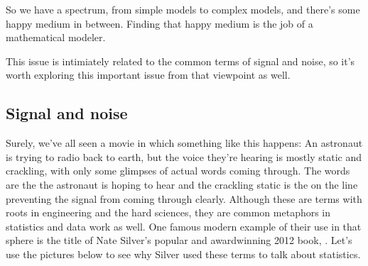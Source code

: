 \documentclass[letterpaper,10pt,english]{sphinxmanual}
\begin{document}
So we have a spectrum, from simple models to complex models, and there’s some happy medium in between.  Finding that happy medium is the job of a mathematical modeler.

This issue is intimiately related to the common terms of signal and noise, so it’s worth exploring this important issue from that viewpoint as well.


\subsection{Signal and noise}
\label{\detokenize{chapter-17-machine-learning:signal-and-noise}}
Surely, we’ve all seen a movie in which something like this happens:  An astronaut is trying to radio back to earth, but the voice they’re hearing is mostly static and crackling, with only some glimpses of actual words coming through.  The words are the  the astronaut is hoping to hear and the crackling static is the  on the line preventing the signal from coming through clearly.  Although these are terms with roots in engineering and the hard sciences, they are common metaphors in statistics and data work as well.  One famous modern example of their use in that sphere is the title of Nate Silver’s popular and award\sphinxhyphen{}winning 2012 book, .  Let’s use the pictures below to see why Silver used these terms to talk about statistics.

\end{document}
